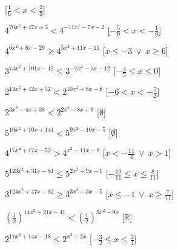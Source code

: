 \begin{esercizio}
\begin{enumeratea}
   \hfill [\(\frac{1}{6} < x < \frac{2}{3}\)]
  \item  \(4^{70 x^2 +47 x +3} < 4^{-11 x^2 -7 x -2}\)
   \hfill [\(-\frac{5}{9} < x < -\frac{1}{9}\)]
  \item  \(4^{6 x^2 +8 x -29} \geqslant 4^{5 x^2 +11 x -11}\)
   \hfill [\(x \leqslant -3~\vee~x \geqslant 6\)]
  \item  \(3^{74 x^2 +101 x -12} \leqslant 3^{-7 x^2 -7 x -12}\)
   \hfill [\(-\frac{4}{3} \leqslant x \leqslant 0\)]
  \item  \(2^{14 x^2 +42 x +52} < 2^{10 x^2 +8 x -8}\)
   \hfill [\(-6 < x < -\frac{5}{2}\)]
  \item  \(2^{3 x^2 -4 x +38} < 2^{2 x^2 -8 x +9}\)
   \hfill [\(\emptyset\)]
  \item  \(5^{10 x^2 +10 x +144} < 5^{9 x^2 -10 x -5}\)
   \hfill [\(\emptyset\)]
  \item  \(4^{17 x^2 +17 x -52} > 4^{x^2 -11 x -8}\)
   \hfill [\(x < -\frac{11}{4}~\vee~x > 1\)]
  \item  \(5^{123 x^2 +31 x -81} \leqslant 5^{2 x^2 +9 x -1}\)
   \hfill [\(-\frac{10}{11} \leqslant x \leqslant \frac{8}{11}\)]
  \item  \(3^{124 x^2 +47 x -82} \geqslant 3^{3 x^2 +3 x -5}\)
   \hfill [\(x \leqslant -1~\vee~x \geqslant \frac{7}{11}\)]
  \item  \(\left(\frac{1}{2}\right)^{14 x^2 +21 x +41} < 
\left(\frac{1}{2}\right)^{5 x^2 -9 x }\)
   \hfill [\(\mathbb{R}\)]
  \item  \(2^{17 x^2 +14 x -18} \leqslant 2^{x^2 +2 x }\)
   \hfill [\(-\frac{3}{2} \leqslant x \leqslant \frac{3}{4}\)]
 \end{enumeratea}
\end{esercizio}



